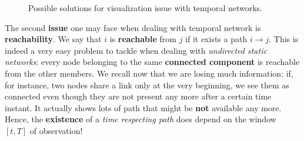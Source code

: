 \documentclass[../main/main.tex]{subfiles}
\begin{document}
\begin{figure}[h!]
\begin{minipage}[c]{0.5\linewidth}
\end{minipage}
\begin{minipage}[]{0.5\linewidth}
\centering
{}
\end{minipage}
\caption{\label{fig:17_04}Possible solutions for visualization issue with temporal networks.}
\end{figure}


The second \textbf{issue} one may face when dealing with temporal network is \textbf{reachability}. We say that $i$ is \textbf{reachable} from $j$ if it exists a path $i\to j$. This is indeed a very easy problem to tackle when dealing with \textit{undirected static networks}: every node belonging to the same \textbf{connected component} is reachable from the other members. We recall now that we are losing much information: if, for instance, two nodes share a link only at the very beginning, we see them as connected even though they are not present any more after a certain time instant. It actually shows lots of path that might be \textbf{not} available any more. Hence, the \textbf{existence} of a \textit{time respecting path} does depend on the window $[t,T]$ of observation!
\end{document}
